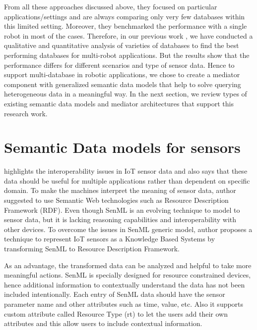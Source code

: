 		From all these approaches discussed above, they focused on particular applications/settings and are always comparing only very few databases within this limited setting. Moreover, they benchmarked the performance with a single robot in most of the cases. Therefore, in our previous work \cite{ravichandranworkbench}, we have conducted a qualitative and quantitative analysis of varieties of databases to find the best performing databases for multi-robot applications. But the results show that the performance differs for different scenarios and type of sensor data. Hence to support multi-database in robotic applications, we chose to create a mediator component with generalized semantic data models that help to solve querying heterogeneous data in a meaningful way. In the next section, we review types of existing semantic data models and mediator architectures that support this research work.
		
	\section{Semantic Data models for sensors}
	\citet{su2014connecting} highlights the interoperability issues in IoT sensor data and also says that these data should be useful for multiple applications rather than dependent on specific domain. To make the machines interpret the meaning of sensor data, author suggested to use Semantic Web technologies such as Resource Description Framework (RDF). Even though SenML is an evolving technique to model to sensor data, but it is lacking reasoning capabilities and interoperability with other devices. To overcome the issues in SenML generic model, author proposes a technique to represent IoT sensors as a Knowledge Based Systems by transforming SenML to Resource Description Framework. 
	
	As an advantage, the transformed data can be analyzed and helpful to take more meaningful actions. 
	SenML is specially designed for resource constrained devices, hence additional information to contextually understand the data has not been included intentionally. Each entry of SenML data should have the sensor parameter name and other attributes such as time, value, etc. Also it supports custom attribute called Resource Type (rt) to let the users add their own attributes and this allow users to include contextual information.
	
